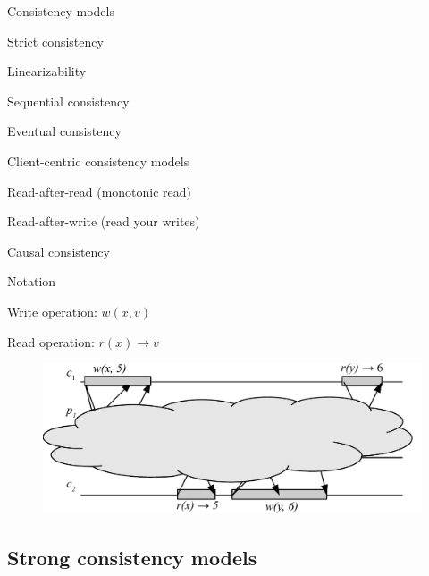 \begin{frame}{Consistency models}
	
\BI
\item Strict consistency
\item Linearizability
\item Sequential consistency
\EI

\smallskip
{}
\BI
\item Eventual consistency
\item Client-centric consistency models
\BI
\item Read-after-read (monotonic read)
\item Read-after-write (read your writes)
\EI
\item Causal consistency 
\EI

\end{frame}	
	
\begin{frame}{Notation}

\BIL
\item \alert{Write operation}: $w(x,v)$
\item \alert{Read operation}: $r(x) \rightarrow v$\\
\EIL

\begin{figure}
\includegraphics[width=\textwidth]{figs/09/lin-03}
\end{figure}

\end{frame}	

\subsection{Strong consistency models}


